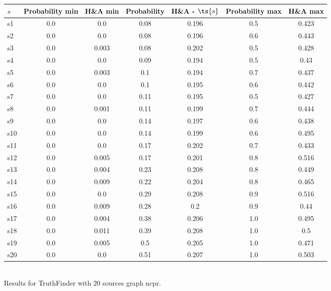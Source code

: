 \documentclass{article}
\begin{document}
\noindent\begin{tabular}{|l|c|c|c|c|c|c|}
\hline
$s$& Probability min & H\&A min & Probability & H\&A - $\ts{s}$ & Probability max & H\&A max\\
\hline
s1 &0.0 & 0.0 & 0.08 & 0.196 & 0.5 & 0.423\\
\hline
s2 &0.0 & 0.0 & 0.08 & 0.196 & 0.6 & 0.443\\
\hline
s3 &0.0 & 0.003 & 0.08 & 0.202 & 0.5 & 0.428\\
\hline
s4 &0.0 & 0.0 & 0.09 & 0.194 & 0.5 & 0.43\\
\hline
s5 &0.0 & 0.003 & 0.1 & 0.194 & 0.7 & 0.437\\
\hline
s6 &0.0 & 0.0 & 0.1 & 0.195 & 0.6 & 0.442\\
\hline
s7 &0.0 & 0.0 & 0.11 & 0.195 & 0.5 & 0.427\\
\hline
s8 &0.0 & 0.001 & 0.11 & 0.199 & 0.7 & 0.444\\
\hline
s9 &0.0 & 0.0 & 0.14 & 0.197 & 0.6 & 0.438\\
\hline
s10 &0.0 & 0.0 & 0.14 & 0.199 & 0.6 & 0.495\\
\hline
s11 &0.0 & 0.0 & 0.17 & 0.202 & 0.7 & 0.433\\
\hline
s12 &0.0 & 0.005 & 0.17 & 0.201 & 0.8 & 0.516\\
\hline
s13 &0.0 & 0.004 & 0.23 & 0.208 & 0.8 & 0.449\\
\hline
s14 &0.0 & 0.009 & 0.22 & 0.204 & 0.8 & 0.465\\
\hline
s15 &0.0 & 0.0 & 0.29 & 0.208 & 0.9 & 0.516\\
\hline
s16 &0.0 & 0.009 & 0.28 & 0.2 & 0.9 & 0.44\\
\hline
s17 &0.0 & 0.004 & 0.38 & 0.206 & 1.0 & 0.495\\
\hline
s18 &0.0 & 0.011 & 0.39 & 0.208 & 1.0 & 0.5\\
\hline
s19 &0.0 & 0.005 & 0.5 & 0.205 & 1.0 & 0.471\\
\hline
s20 &0.0 & 0.0 & 0.51 & 0.207 & 1.0 & 0.503\\
\hline
\end{tabular}\\

\noindent Results for TruthFinder with 20 sources graph ncpr.
\end{document}
